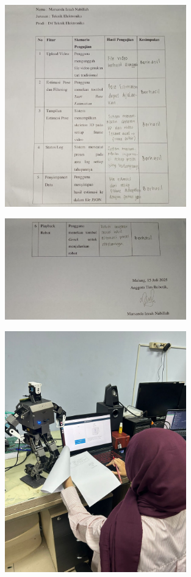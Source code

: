 \begin{figure}[H]
        \centering
        \includegraphics[width=0.7\textwidth]{images/blackbox1.jpeg}
        \label{fig:bb1}
\end{figure}

\begin{figure}[H]
        \centering
        \includegraphics[width=0.7\textwidth]{images/blackbox2.jpeg}
        \label{fig:bb2}
\end{figure}

\clearpage
{}
\begin{figure}[H]
        \centering
        \includegraphics[width=0.7\textwidth]{images/pengambilan_data.jpeg}
        \label{fig:pd}
\end{figure}